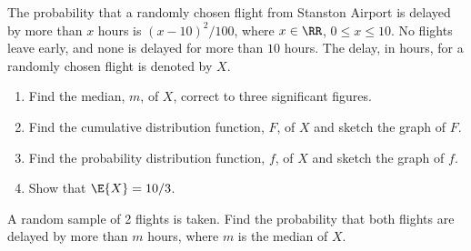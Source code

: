 \begin{problem}
    The probability that a randomly chosen flight from Stanston Airport is delayed by more than $x$ hours is $(x-10)^2/100$, where $x\in\RR$, $0\leq x\leq10$. No flights leave early, and none is delayed for more than $10$ hours. The delay, in hours, for a randomly chosen flight is denoted by $X$.

    \begin{enumerate}
        \item Find the median, $m$, of $X$, correct to three significant figures.
        \item Find the cumulative distribution function, $F$, of $X$ and sketch the graph of $F$.
        \item Find the probability distribution function, $f$, of $X$ and sketch the graph of $f$.
        \item Show that $\E{X} = 10/3$.
    \end{enumerate}

    A random sample of 2 flights is taken. Find the probability that both flights are delayed by more than $m$ hours, where $m$ is the median of $X$.
\end{problem}
